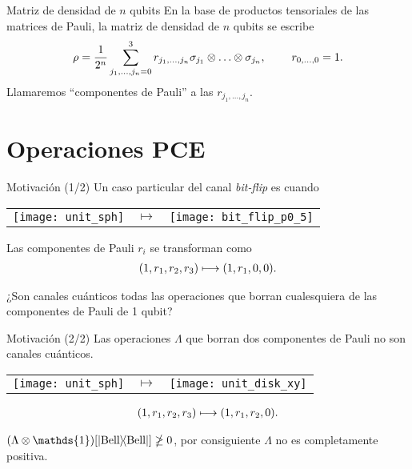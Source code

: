 \documentclass[xcolor=dvipsnames,presentation]{beamer}%
\begin{document}
\begin{frame}{Matriz de densidad de $n$ qubits}
	En la base de productos tensoriales de las matrices de Pauli, 
	la matriz de densidad de $n$ qubits se escribe
	\begin{align*}
		\rho = \frac{1}{2^n}\sum _{j_1,\ldots,j_n=0}^3 r_{j_1,\ldots,j_n}
		\sigma_{j_1}\otimes \ldots
		\otimes\sigma_{j_n},\hspace{.8cm} r_{0,\ldots,0}=1.
	\end{align*}
	\alert{Llamaremos ``componentes de Pauli'' a las $r_{j_1,\ldots,j_n}$.}
\end{frame}

\section{Operaciones PCE}
\label{sec:Theory}

\begin{frame}{Motivación (1/2)}
	Un caso particular del canal \textit{bit-flip} es cuando
	\begin{center}
	\begin{tabular}{m{2.5cm} m{1.5cm} m{2.5cm}}
		\texttt{[image: unit\_sph]}
		& \hfill \LARGE{$\longmapsto$}
		& \texttt{[image: bit\_flip\_p0\_5]}
	\end{tabular}
	\end{center}
	
	Las componentes de Pauli $r_i$ se transforman como
	\begin{align*}
	\qty(1,r_1,r_2,r_3)\longmapsto \qty(1,r_1,0,0).
	\end{align*}
	
	\alert{¿Son canales cuánticos todas las operaciones que borran
	cualesquiera de las componentes de Pauli de 1 qubit?}

\end{frame}


\begin{frame}{Motivación (2/2)}
	\only<1>{\alert{No.}}
	Las operaciones $\Lambda$ que borran dos componentes de Pauli no 
	son canales cuánticos.
	\begin{center}
	\begin{tabular}{m{2.5cm} m{1.3cm} m{2.5cm}}
		\texttt{[image: unit\_sph]}
		& \hfill \LARGE{$\longmapsto$}
		& \texttt{[image: unit\_disk\_xy]}
	\end{tabular}
	\end{center}
	\vspace{-1cm}
	\begin{align*}
	\qty(1,r_1,r_2,r_3)\longmapsto\qty(1,r_1,r_2,0).
	\end{align*}
	
	\alert{$\qty(\Lambda\otimes \mathds{1})\qty[\dyad{\text{Bell}}{\text{Bell}}]\ngeq0$, 
	por consiguiente	$\Lambda$ no es completamente positiva.}
		
	\vspace{.5cm}
\end{frame}
\end{document}
